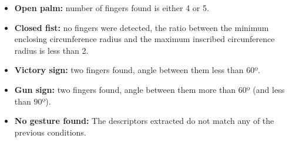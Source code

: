 \begin{itemize}
\item {\bfseries Open palm:} number of fingers found is either 4 or 5.
\item {\bfseries Closed fist:} no fingers were detected, the ratio between the minimum enclosing circunference radius and the maximum inscribed circunference radius is less than 2.
\item {\bfseries Victory sign:} two fingers found, angle between them less than 60º.
\item {\bfseries Gun sign:} two fingers found, angle between them more than 60º (and less than 90º).
\item {\bfseries No gesture found:} The descriptors extracted do not match any of the previous conditions.
\end{itemize}

